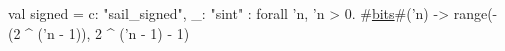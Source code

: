 val signed = {
  c: "sail_signed",
  _: "sint"
} : forall 'n, 'n > 0. #\hyperref[zbits]{bits}#('n) -> range(- (2 ^ ('n - 1)), 2 ^ ('n - 1) - 1)
